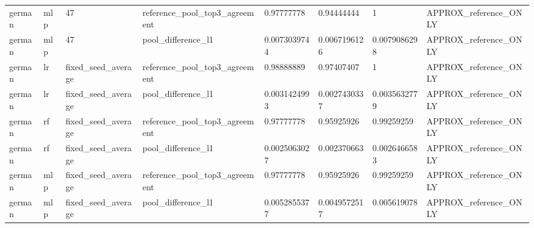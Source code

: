\begin{tabular}{llllllll}
german & mlp & 47 & reference\_pool\_top3\_agreement & 0.97777778 & 0.94444444 & 1 & APPROX\_reference\_ONLY \\
german & mlp & 47 & pool\_difference\_l1 & 0.0073039744 & 0.0067196126 & 0.0079086298 & APPROX\_reference\_ONLY \\
german & lr & fixed\_seed\_average & reference\_pool\_top3\_agreement & 0.98888889 & 0.97407407 & 1 & APPROX\_reference\_ONLY \\
german & lr & fixed\_seed\_average & pool\_difference\_l1 & 0.0031424993 & 0.0027430337 & 0.0035632779 & APPROX\_reference\_ONLY \\
german & rf & fixed\_seed\_average & reference\_pool\_top3\_agreement & 0.97777778 & 0.95925926 & 0.99259259 & APPROX\_reference\_ONLY \\
german & rf & fixed\_seed\_average & pool\_difference\_l1 & 0.0025063027 & 0.002370663 & 0.0026466583 & APPROX\_reference\_ONLY \\
german & mlp & fixed\_seed\_average & reference\_pool\_top3\_agreement & 0.97777778 & 0.95925926 & 0.99259259 & APPROX\_reference\_ONLY \\
german & mlp & fixed\_seed\_average & pool\_difference\_l1 & 0.0052855377 & 0.0049572517 & 0.005619078 & APPROX\_reference\_ONLY \\
\bottomrule
\end{tabular}
